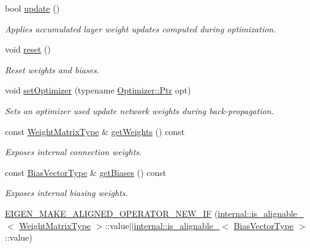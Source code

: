 \begin{DoxyCompactItemize}
bool \hyperlink{classffnn_1_1layer_1_1_fully_connected_a7dd4dbe010c3d290c131b21b35f6301e}{update} ()
\begin{DoxyCompactList}\small\item\em Applies accumulated layer weight updates computed during optimization. \end{DoxyCompactList}\item 
void \hyperlink{classffnn_1_1layer_1_1_fully_connected_aaeb55e214173a632b297d3ddac76fc24}{reset} ()
\begin{DoxyCompactList}\small\item\em Reset weights and biases. \end{DoxyCompactList}\item 
void \hyperlink{classffnn_1_1layer_1_1_fully_connected_ae57e6eedc1808825635a1c04aa018992}{set\-Optimizer} (typename \hyperlink{classffnn_1_1optimizer_1_1_optimizer_ac03e7181934bf0c12a97fc67a60484ab}{Optimizer\-::\-Ptr} opt)
\begin{DoxyCompactList}\small\item\em Sets an optimizer used update network weights during back-\/propagation. \end{DoxyCompactList}\item 
const \hyperlink{classffnn_1_1layer_1_1_fully_connected_aef17d91a349bf83f5e5a20462ebb3c81}{Weight\-Matrix\-Type} \& \hyperlink{classffnn_1_1layer_1_1_fully_connected_a96e00e6f6fec19f22a8830e5342bc7ef}{get\-Weights} () const 
\begin{DoxyCompactList}\small\item\em Exposes internal connection weights. \end{DoxyCompactList}\item 
const \hyperlink{classffnn_1_1layer_1_1_fully_connected_afd08719c4360bd1447d1108396b07e57}{Bias\-Vector\-Type} \& \hyperlink{classffnn_1_1layer_1_1_fully_connected_af7492d5d678fd45466d7768ab187a41e}{get\-Biases} () const 
\begin{DoxyCompactList}\small\item\em Exposes internal biasing weights. \end{DoxyCompactList}\item 
\hyperlink{classffnn_1_1layer_1_1_fully_connected_a6b0a8b43f0ed64bf8ab20ef3f4395aae}{E\-I\-G\-E\-N\-\_\-\-M\-A\-K\-E\-\_\-\-A\-L\-I\-G\-N\-E\-D\-\_\-\-O\-P\-E\-R\-A\-T\-O\-R\-\_\-\-N\-E\-W\-\_\-\-I\-F} (\hyperlink{structffnn_1_1layer_1_1internal_1_1is__alignable__128}{internal\-::is\-\_\-alignable\-\_}$<$ \hyperlink{classffnn_1_1layer_1_1_fully_connected_aef17d91a349bf83f5e5a20462ebb3c81}{Weight\-Matrix\-Type} $>$\-::value$\vert$$\vert$\hyperlink{structffnn_1_1layer_1_1internal_1_1is__alignable__128}{internal\-::is\-\_\-alignable\-\_}$<$ \hyperlink{classffnn_1_1layer_1_1_fully_connected_afd08719c4360bd1447d1108396b07e57}{Bias\-Vector\-Type} $>$\-::value)
\end{DoxyCompactItemize}
